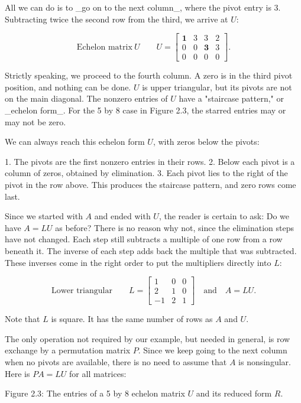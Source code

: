 All we can do is to _go on to the next column_, where the pivot entry is 3. Subtracting twice the second row from the third, we arrive at \(U\):

\[\text{{Echelon matrix}}\ U\qquad U=\begin{bmatrix}\mathbf{1}&3&3&2\\ 0&0&\mathbf{3}&3\\ 0&0&0&0\end{bmatrix}.\]

Strictly speaking, we proceed to the fourth column. A zero is in the third pivot position, and nothing can be done. \(U\) is upper triangular, but its pivots are not on the main diagonal. The nonzero entries of \(U\) have a "staircase pattern," or _echelon form_. For the 5 by 8 case in Figure 2.3, the starred entries may or may not be zero.

We can always reach this echelon form \(U\), with zeros below the pivots:

1. The pivots are the first nonzero entries in their rows.
2. Below each pivot is a column of zeros, obtained by elimination.
3. Each pivot lies to the right of the pivot in the row above. This produces the staircase pattern, and zero rows come last.

Since we started with \(A\) and ended with \(U\), the reader is certain to ask: Do we have \(A=LU\) as before? There is no reason why not, since the elimination steps have not changed. Each step still subtracts a multiple of one row from a row beneath it. The inverse of each step adds back the multiple that was subtracted. These inverses come in the right order to put the multipliers directly into \(L\):

\[\text{{Lower triangular}}\qquad L=\begin{bmatrix}1&0&0\\ 2&1&0\\ -1&2&1\end{bmatrix}\quad\text{and}\quad A=LU.\]

Note that \(L\) is square. It has the same number of rows as \(A\) and \(U\).

The only operation not required by our example, but needed in general, is row exchange by a permutation matrix \(P\). Since we keep going to the next column when no pivots are available, there is no need to assume that \(A\) is nonsingular. Here is \(PA=LU\) for all matrices:

Figure 2.3: The entries of a 5 by 8 echelon matrix \(U\) and its reduced form \(R\).

 